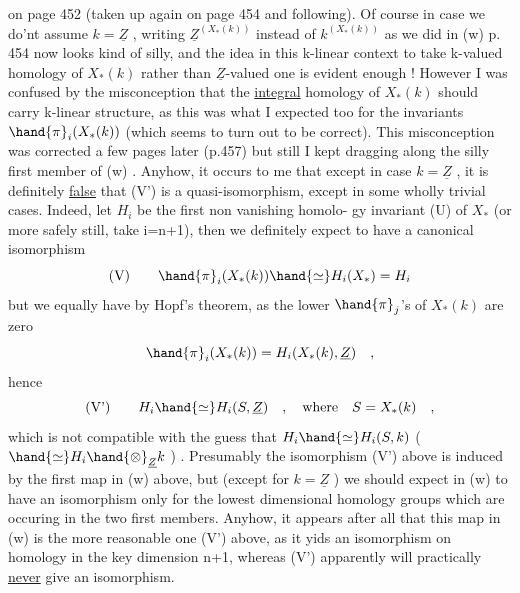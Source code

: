 
on page 452 (taken up again on page 454 and following).   Of course in
case we do'nt assume $k=\underline{Z}$ ,  writing $\underline{Z}^{(X_*(k))}$ instead of $k^{(X_*(k))}$ as
we did in (w) p. 454 now looks kind of silly,  and the idea in this 
k-linear context to take k-valued homology of $X_*(k)$ rather than $\underline{Z}$-valued
one is evident enough !  However I was confused by the misconception that
the \uline{integral} homology of $X_*(k)$ should carry k-linear structure, as
this was what I expected too for the invariants $\hand{\pi}_i(X_*(k))$ (which seems
to turn out to be correct).  This misconception was corrected a few
pages later (p.457) but still I kept dragging along the silly first
member of (w) .  Anyhow, it  occurs to me that except in case $k=\underline{Z}$ , it
is definitely \uline{false} that (V') is a quasi-isomorphism, except in some
wholly trivial cases.  Indeed, let $H_i$ be the first non vanishing homolo-%
gy invariant (U) of $X_*$ (or more safely still, take i=n+1), then
we definitely expect to have a canonical isomorphism 
\[ \text{(V)} \qquad \hand{\pi}_i(X_*(k)) \hand{\simeq} H_i(X_*) = H_i \]
but we equally have by Hopf's theorem, as the lower $\hand{\pi}_j$'s of $X_*(k)$ are
zero
\[ \hand{\pi}_i(X_*(k)) = H_i(X_*(k), \underline{Z}) \quad , \]
hence 
\[ \text{(V')} \qquad H_i \hand{\simeq} H_i(S,\underline{Z}) \quad , \quad \text{where} \quad S = X_*(k) \quad , \]
which is not compatible with the guess that $H_i \hand{\simeq} H_i(S,k)$ ($\hand{\simeq} H_i \hand{\otimes}_{\underline{Z}} k$ ) .
Presumably the isomorphism (V') above is induced by the first
map in (w) above, but (except for $k=\underline{Z}$ ) we should expect in (w) to
have an isomorphism only for the lowest dimensional homology groups
which are occuring in the two first members.  Anyhow, it appears after
all that this map in (w) is the more reasonable one   (V') above, as
it yids an isomorphism on homology in the key dimension n+1, whereas
(V') apparently will practically \uline{never} give an isomorphism.

